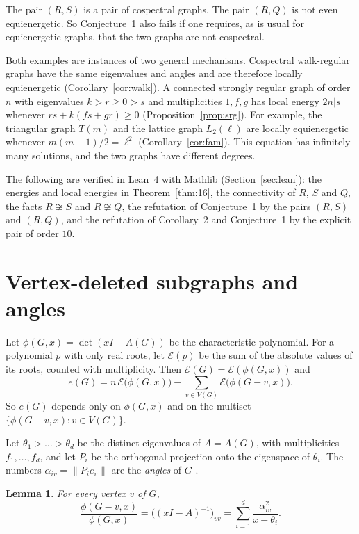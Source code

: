 \documentclass[11pt]{amsart}
\newtheorem{lemma}[theorem]{Lemma}
\theoremstyle{remark}
\newcommand{\cE}{\mathcal{E}}
\begin{document}
The pair $(R,S)$ is a pair of cospectral graphs.
The pair $(R,Q)$ is not even equienergetic.
So Conjecture~1 also fails if one requires, as is usual for equienergetic graphs, that the two graphs are not cospectral.

Both examples are instances of two general mechanisms.
Cospectral walk-regular graphs have the same eigenvalues and angles and are therefore locally equienergetic (Corollary~\ref{cor:walk}).
A connected strongly regular graph of order $n$ with eigenvalues $k>r\ge0>s$ and multiplicities $1,f,g$ has local energy $2n|s|$ whenever $rs+k(fs+gr)\ge0$ (Proposition~\ref{prop:srg}).
For example, the triangular graph $T(m)$ and the lattice graph $L_2(\ell)$ are locally equienergetic whenever $m(m-1)/2=\ell^2$ (Corollary~\ref{cor:fam}).
This equation has infinitely many solutions, and the two graphs have different degrees.

The following are verified in Lean~4 with Mathlib (Section~\ref{sec:lean}): the energies and local energies in Theorem~\ref{thm:16}, the connectivity of $R$, $S$ and $Q$, the facts $R\not\cong S$ and $R\not\cong Q$, the refutation of Conjecture~1 by the pairs $(R,S)$ and $(R,Q)$, and the refutation of Corollary~2 and Conjecture~1 by the explicit pair of order $10$.

\section{Vertex-deleted subgraphs and angles}\label{sec:angles}

Let $\phi(G,x)=\det(xI-A(G))$ be the characteristic polynomial.
For a polynomial $p$ with only real roots, let $\cE(p)$ be the sum of the absolute values of its roots, counted with multiplicity.
Then $\cE(G)=\cE(\phi(G,x))$ and
\begin{equation}\label{eq:e}
e(G)=n\,\cE\bigl(\phi(G,x)\bigr)-\sum_{v\in V(G)}\cE\bigl(\phi(G-v,x)\bigr).
\end{equation}
So $e(G)$ depends only on $\phi(G,x)$ and on the multiset $\{\phi(G-v,x):v\in V(G)\}$.

Let $\theta_1>\dots>\theta_d$ be the distinct eigenvalues of $A=A(G)$, with multiplicities $f_1,\dots,f_d$, and let $P_i$ be the orthogonal projection onto the eigenspace of $\theta_i$.
The numbers $\alpha_{iv}=\|P_ie_v\|$ are the \emph{angles} of $G$ \cite{CRS}.

\begin{lemma}\label{lem:angles}
For every vertex $v$ of $G$,
\[
\frac{\phi(G-v,x)}{\phi(G,x)}=\bigl((xI-A)^{-1}\bigr)_{vv}=\sum_{i=1}^d\frac{\alpha_{iv}^2}{x-\theta_i}.
\]
\end{lemma}
\end{document}
